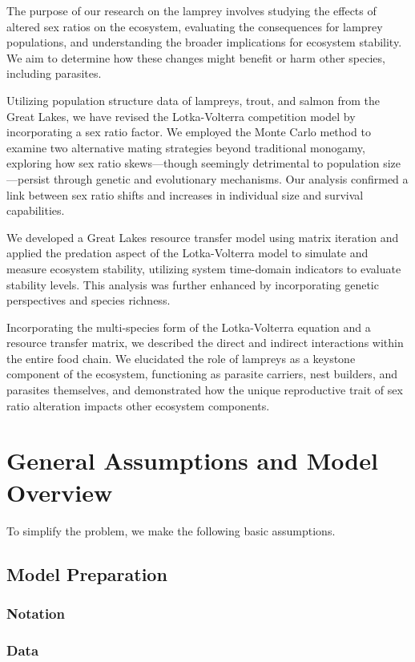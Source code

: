 \documentclass[12pt]{article}
\begin{document}
The purpose of our research on the lamprey involves studying the effects of altered sex ratios on the ecosystem,
evaluating the consequences for lamprey populations, and understanding the broader implications for ecosystem
stability. We aim to determine how these changes might benefit or harm other species, including parasites.

Utilizing population structure data of lampreys, trout, and salmon from the Great Lakes, we have revised the
Lotka-Volterra competition model by incorporating a sex ratio factor. We employed the Monte Carlo method to
examine two alternative mating strategies beyond traditional monogamy, exploring how sex ratio skews—though
seemingly detrimental to population size—persist through genetic and evolutionary mechanisms. Our analysis
confirmed a link between sex ratio shifts and increases in individual size and survival capabilities.

We developed a Great Lakes resource transfer model using matrix iteration and applied the predation aspect
of the Lotka-Volterra model to simulate and measure ecosystem stability, utilizing system time-domain
indicators to evaluate stability levels. This analysis was further enhanced by incorporating genetic
perspectives and species richness.

Incorporating the multi-species form of the Lotka-Volterra equation and a resource transfer matrix, we
described the direct and indirect interactions within the entire food chain. We elucidated the role of
lampreys as a keystone component of the ecosystem, functioning as parasite carriers, nest builders,
and parasites themselves, and demonstrated how the unique reproductive trait of sex ratio alteration
impacts other ecosystem components.
\section{General Assumptions and Model Overview}
To simplify the problem, we make the following basic assumptions.
\subsection*{Model Preparation}
\subsubsection*{Notation}
\subsubsection*{Data}
\end{document}
